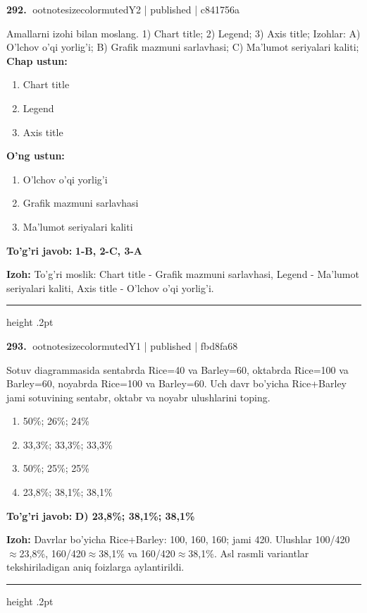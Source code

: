 \documentclass[10pt,a4paper]{article}
\begin{document}
\textbf{\color{ink}292.} {ootnotesizecolor{muted}Y2 | published | c841756a}
\par
Amallarni izohi bilan moslang.  1) Chart title;  2) Legend;  3) Axis title;  Izohlar: A) O'lchov o'qi yorlig'i;  B) Grafik mazmuni sarlavhasi;  C) Ma'lumot seriyalari kaliti;
\textbf{Chap ustun:}\begin{enumerate}[label=\arabic*),leftmargin=9mm]
\item Chart title
\item Legend
\item Axis title
\end{enumerate}
\textbf{O'ng ustun:}\begin{enumerate}[label=\Alph*),leftmargin=9mm]
\item O'lchov o'qi yorlig'i
\item Grafik mazmuni sarlavhasi
\item Ma'lumot seriyalari kaliti
\end{enumerate}
\begin{tcolorbox}[enhanced,breakable,colback=teal!4,colframe=teal!55!black,boxrule=0.45pt,arc=1.2mm,left=2.8mm,right=2.8mm,top=2mm,bottom=2mm]
\textbf{\color{teal}To'g'ri javob:} \textbf{1-B, 2-C, 3-A}
\par\smallskip
\textbf{Izoh:} To'g'ri moslik: Chart title - Grafik mazmuni sarlavhasi, Legend - Ma'lumot seriyalari kaliti, Axis title - O'lchov o'qi yorlig'i.
\end{tcolorbox}
\vspace{2mm}\hrule height .2pt\vspace{2mm}

\textbf{\color{ink}293.} {ootnotesizecolor{muted}Y1 | published | fbd8fa68}
\par
Sotuv diagrammasida sentabrda Rice=40 va Barley=60, oktabrda Rice=100 va Barley=60, noyabrda Rice=100 va Barley=60. Uch davr bo'yicha Rice+Barley jami sotuvining sentabr, oktabr va noyabr ulushlarini toping.
\begin{enumerate}[label=\Alph*),leftmargin=9mm]
\item 50\%; 26\%; 24\%
\item 33,3\%; 33,3\%; 33,3\%
\item 50\%; 25\%; 25\%
\item 23,8\%; 38,1\%; 38,1\%
\end{enumerate}
\begin{tcolorbox}[enhanced,breakable,colback=teal!4,colframe=teal!55!black,boxrule=0.45pt,arc=1.2mm,left=2.8mm,right=2.8mm,top=2mm,bottom=2mm]
\textbf{\color{teal}To'g'ri javob:} \textbf{D) 23,8\%; 38,1\%; 38,1\%}
\par\smallskip
\textbf{Izoh:} Davrlar bo'yicha Rice+Barley: 100, 160, 160; jami 420. Ulushlar 100/420\ensuremath{\approx}23,8\%, 160/420\ensuremath{\approx}38,1\% va 160/420\ensuremath{\approx}38,1\%. Asl rasmli variantlar tekshiriladigan aniq foizlarga aylantirildi.
\end{tcolorbox}
\vspace{2mm}\hrule height .2pt\vspace{2mm}
\end{document}
